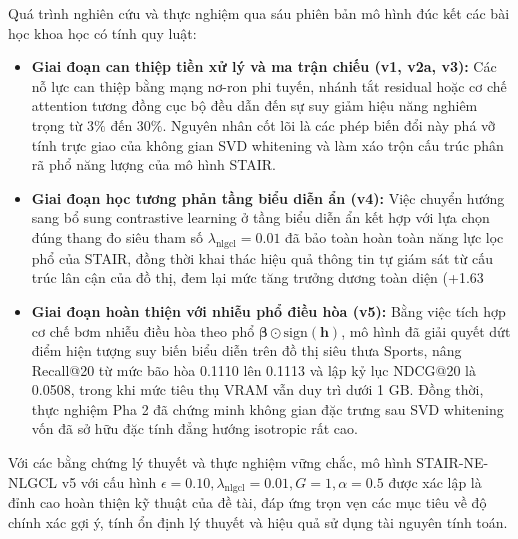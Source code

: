 Quá trình nghiên cứu và thực nghiệm qua sáu phiên bản mô hình đúc kết các bài học khoa học có tính quy luật:
\begin{itemize}
    \item \textbf{Giai đoạn can thiệp tiền xử lý và ma trận chiếu (v1, v2a, v3):} Các nỗ lực can thiệp bằng mạng nơ-ron phi tuyến, nhánh tắt residual hoặc cơ chế attention tương đồng cục bộ đều dẫn đến sự suy giảm hiệu năng nghiêm trọng từ $3\%$ đến $30\%$. Nguyên nhân cốt lõi là các phép biến đổi này phá vỡ tính trực giao của không gian SVD whitening và làm xáo trộn cấu trúc phân rã phổ năng lượng của mô hình STAIR.
    \item \textbf{Giai đoạn học tương phản tầng biểu diễn ẩn (v4):} Việc chuyển hướng sang bổ sung contrastive learning ở tầng biểu diễn ẩn kết hợp với lựa chọn đúng thang đo siêu tham số $\lambda_{\text{nlgcl}} = 0.01$ đã bảo toàn hoàn toàn năng lực lọc phổ của STAIR, đồng thời khai thác hiệu quả thông tin tự giám sát từ cấu trúc lân cận của đồ thị, đem lại mức tăng trưởng dương toàn diện (+1.63%
    \item \textbf{Giai đoạn hoàn thiện với nhiễu phổ điều hòa (v5):} Bằng việc tích hợp cơ chế bơm nhiễu điều hòa theo phổ $\boldsymbol{\beta} \odot \text{sign}(\mathbf{h})$, mô hình đã giải quyết dứt điểm hiện tượng suy biến biểu diễn trên đồ thị siêu thưa Sports, nâng Recall@20 từ mức bão hòa 0.1110 lên 0.1113 và lập kỷ lục NDCG@20 là 0.0508, trong khi mức tiêu thụ VRAM vẫn duy trì dưới 1 GB. Đồng thời, thực nghiệm Pha 2 đã chứng minh không gian đặc trưng sau SVD whitening vốn đã sở hữu đặc tính đẳng hướng isotropic rất cao.
\end{itemize}

Với các bằng chứng lý thuyết và thực nghiệm vững chắc, mô hình STAIR-NE-NLGCL v5 với cấu hình $\epsilon = 0.10, \lambda_{\text{nlgcl}} = 0.01, G = 1, \alpha = 0.5$ được xác lập là đỉnh cao hoàn thiện kỹ thuật của đề tài, đáp ứng trọn vẹn các mục tiêu về độ chính xác gợi ý, tính ổn định lý thuyết và hiệu quả sử dụng tài nguyên tính toán.

\clearpage
